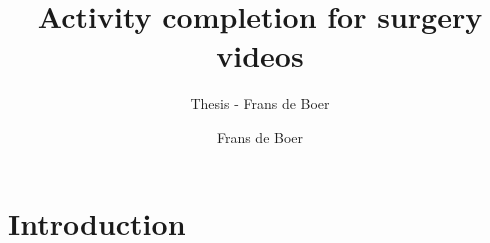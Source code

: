 \documentclass[sigconf,nonacm]{acmart}
\begin{document}
\title{Activity completion for surgery videos}
\subtitle{Thesis - Frans de Boer}


\author{Frans de Boer}


\renewcommand{\shortauthors}{de Boer}

\begin{abstract}

\end{abstract}


\maketitle

\section{Introduction}
\end{document}

